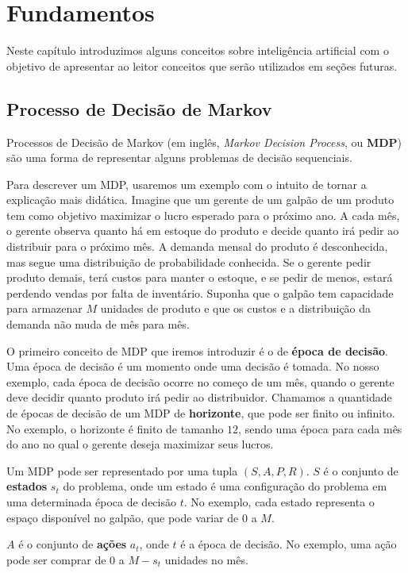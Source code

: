 \chapter{Fundamentos}
\label{chap:fund}
Neste capítulo introduzimos alguns conceitos sobre inteligência artificial com o objetivo de apresentar ao leitor conceitos que serão utilizados em seções futuras.

\section{Processo de Decisão de Markov}
\label{ssec:mdp}

Processos de Decisão de Markov (em inglês, \textit{Markov Decision Process}, ou \textbf{MDP})
são uma forma de representar alguns problemas de decisão sequenciais.

Para descrever um MDP, usaremos um exemplo com o intuito de tornar a explicação mais didática.
Imagine que um gerente de um galpão de um produto tem como objetivo maximizar o lucro esperado
para o próximo ano. A cada mês, o gerente observa quanto há em estoque do produto e decide
quanto irá pedir ao distribuir para o próximo mês. A demanda mensal do produto é desconhecida,
mas segue uma distribuição de probabilidade conhecida. Se o gerente pedir produto demais, terá
custos para manter o estoque, e se pedir de menos, estará perdendo vendas por falta de inventário.
Suponha que o galpão tem capacidade para armazenar $M$ unidades de produto e que os custos e a
distribuição da demanda não muda de mês para mês.

O primeiro conceito de MDP que iremos introduzir é o de \textbf{época de decisão}. Uma época de
decisão é um momento onde uma decisão é tomada. No nosso exemplo, cada época de decisão ocorre
no começo de um mês, quando o gerente deve decidir quanto produto irá pedir ao distribuidor. Chamamos
a quantidade de épocas de decisão de um MDP de \textbf{horizonte}, que pode ser finito ou infinito.
No exemplo, o horizonte é finito de tamanho $12$, sendo uma época para cada mês do ano no qual o
gerente deseja maximizar seus lucros.

Um MDP pode ser representado por uma tupla $(S, A, P, R)$. $S$ é o conjunto de \textbf{estados}
$s_t$ do problema, onde um estado é uma configuração do problema em uma determinada época de
decisão $t$. No exemplo, cada estado representa o espaço disponível no galpão, que pode variar
de $0$ a $M$.

$A$ é o conjunto de \textbf{ações} $a_t$, onde $t$ é a época de decisão. No exemplo, uma ação
pode ser comprar de $0$ a $M-s_t$ unidades no mês.

